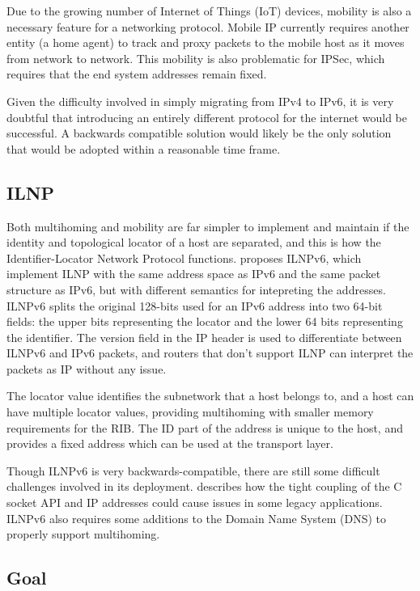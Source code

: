 \documentclass[12pt]{article}
\begin{document}
Due to the growing number of Internet of Things (IoT) devices, mobility is also a necessary feature for a networking protocol. Mobile IP currently requires another entity (a home agent) to track and proxy packets to the mobile host as it moves from network to network. This mobility is also problematic for IPSec, which requires that the end system addresses remain fixed.

Given the difficulty involved in simply migrating from IPv4 to IPv6, it is very doubtful that introducing an entirely different protocol for the internet would be successful. A backwards compatible solution would likely be the only solution that would be adopted within a reasonable time frame.

\subsection{ILNP}

Both multihoming and mobility are far simpler to implement and maintain if the identity and topological locator of a host are separated, and this is how the Identifier-Locator Network Protocol functions. \cite{5586444} proposes ILNPv6, which implement ILNP with the same address space as IPv6 and the same packet structure as IPv6, but with different semantics for intepreting the addresses. ILNPv6 splits the original 128-bits used for an IPv6 address into two 64-bit fields: the upper bits representing the locator and the lower 64 bits representing the identifier. The version field in the IP header is used to differentiate between ILNPv6 and IPv6 packets, and routers that don't support ILNP can interpret the packets as IP without any issue. 

The locator value identifies the subnetwork that a host belongs to, and a host can have multiple locator values, providing multihoming with smaller memory requirements for the RIB. The ID part of the address is unique to the host, and provides a fixed address which can be used at the transport layer.

Though ILNPv6 is very backwards-compatible, there are still some difficult challenges involved in its deployment. \cite{ipwithoutip} describes how the tight coupling of the C socket API and IP addresses could cause issues in some legacy applications. ILNPv6 also requires some additions to the Domain Name System (DNS) to properly support multihoming.

\subsection{Goal}
\end{document}

